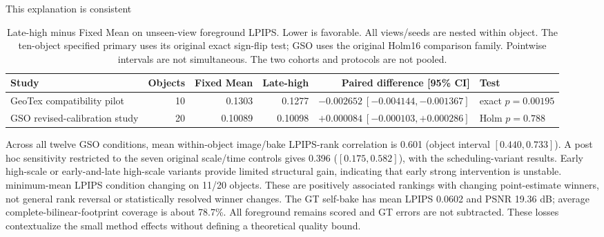 \documentclass[times,twocolumn,final]{elsarticle}
\providecommand{\DIFadd}[1]{{\protect\color{blue} \sf #1}} %
\providecommand{\DIFdel}[1]{{\protect\color{red} \scriptsize #1}} %
\providecommand{\DIFaddbegin}{} %
\providecommand{\DIFaddend}{} %
\providecommand{\DIFdelbegin}{} %
\providecommand{\DIFdelend}{} %
\begin{document}
\DIFdelbegin \DIFdel{This explanation is consistent }\DIFdelend \DIFaddbegin \begin{table}[t]\centering\scriptsize\setlength{\tabcolsep}{4pt}
\caption{Late-high minus Fixed Mean on unseen-view foreground LPIPS. Lower is favorable. All views/seeds are nested within object. The ten-object specified primary uses its original exact sign-flip test; GSO uses the original Holm16 comparison family. Pointwise intervals are not simultaneous. The two cohorts and protocols are not pooled.}
\label{tab:bake-cohorts}
\begin{tabular}{lrrrrl}
\toprule Study & Objects & Fixed Mean & Late-high & Paired difference [95\% CI] & Test \\
\midrule
GeoTex compatibility pilot & 10 & 0.1303 & 0.1277 & $-0.002652\ [-0.004144,-0.001367]$ & exact $p=0.00195$ \\
GSO revised-calibration study & 20 & 0.10089 & 0.10098 & $+0.000084\ [-0.000103,+0.000286]$ & Holm $p=0.788$ \\
\bottomrule\end{tabular}\end{table}

\DIFadd{Across all twelve GSO conditions, mean within-object image/bake LPIPS-rank correlation is 0.601 (object interval $[0.440,0.733]$). A post hoc sensitivity restricted to the seven original scale/time controls gives 0.396 ($[0.175,0.582]$), }\DIFaddend with the \DIFdelbegin \DIFdel{scheduling-variant results. Early high-scale or early-and-late high-scale variants provide limited structural gain, indicating that early strong intervention is unstable. }\DIFdelend \DIFaddbegin \DIFadd{minimum-mean LPIPS condition changing on 11/20 objects. These are positively associated rankings with changing point-estimate winners, not general rank reversal or statistically resolved winner changes. The GT self-bake has mean LPIPS 0.0602 and PSNR 19.36 dB; average complete-bilinear-footprint coverage is about 78.7\%. All foreground remains scored and GT errors are not subtracted. These losses contextualize the small method effects without defining a theoretical quality bound.
}
\end{document}
